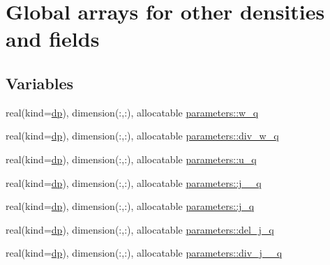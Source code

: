 \hypertarget{group__OTHER__DENSITIES}{}\section{Global arrays for other densities and fields}
\label{group__OTHER__DENSITIES}
\subsection*{Variables}
\begin{DoxyCompactItemize}
\item 
real(kind=\mbox{\hyperlink{namespaceparameters_a52f8c6351fd79345d8811e065bcbbb37}{dp}}), dimension(\+:,\+:), allocatable \mbox{\hyperlink{group__OTHER__DENSITIES_ga59950b9367b0a0afc462c00ef2eee424}{parameters\+::w\+\_\+q}}
\item 
real(kind=\mbox{\hyperlink{namespaceparameters_a52f8c6351fd79345d8811e065bcbbb37}{dp}}), dimension(\+:,\+:), allocatable \mbox{\hyperlink{group__OTHER__DENSITIES_ga20b386857a74ab08ec424aa7d6524f8b}{parameters\+::div\+\_\+w\+\_\+q}}
\item 
real(kind=\mbox{\hyperlink{namespaceparameters_a52f8c6351fd79345d8811e065bcbbb37}{dp}}), dimension(\+:,\+:), allocatable \mbox{\hyperlink{group__OTHER__DENSITIES_gae3217b84aeb9cb26575532fa2c7990cf}{parameters\+::u\+\_\+q}}
\item 
real(kind=\mbox{\hyperlink{namespaceparameters_a52f8c6351fd79345d8811e065bcbbb37}{dp}}), dimension(\+:,\+:), allocatable \mbox{\hyperlink{group__OTHER__DENSITIES_ga387eae15dcba990096da0b0a974f9858}{parameters\+::j\+\_\+\_\+q}}
\item 
real(kind=\mbox{\hyperlink{namespaceparameters_a52f8c6351fd79345d8811e065bcbbb37}{dp}}), dimension(\+:,\+:), allocatable \mbox{\hyperlink{group__OTHER__DENSITIES_gad0e3f674777d52020dcc69ec065a4710}{parameters\+::j\+\_\+q}}
\item 
real(kind=\mbox{\hyperlink{namespaceparameters_a52f8c6351fd79345d8811e065bcbbb37}{dp}}), dimension(\+:,\+:), allocatable \mbox{\hyperlink{group__OTHER__DENSITIES_gaa93ef4a0286129df654277cffb40933b}{parameters\+::del\+\_\+j\+\_\+q}}
\item 
real(kind=\mbox{\hyperlink{namespaceparameters_a52f8c6351fd79345d8811e065bcbbb37}{dp}}), dimension(\+:,\+:), allocatable \mbox{\hyperlink{group__OTHER__DENSITIES_ga42f7b6eda54c2f6b7dbfbc5a0d3a1bf4}{parameters\+::div\+\_\+j\+\_\+\_\+q}}
\item 

\end{DoxyCompactItemize}
